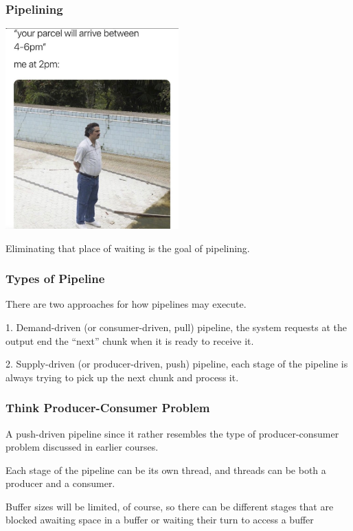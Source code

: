 \begin{frame}
\frametitle{Pipelining}
\begin{center}
	\includegraphics[width=0.5\textwidth]{images/waiting.jpg}
\end{center}


Eliminating that place of waiting is the goal of pipelining.

\end{frame}

\begin{frame}
\frametitle{Types of Pipeline}

There are two approaches for how pipelines may execute. 

1. Demand-driven (or consumer-driven, pull) pipeline, the system requests at the output end the ``next'' chunk when it is ready to receive it.

2. Supply-driven (or producer-driven, push) pipeline, each stage of the pipeline is always trying to pick up the next chunk and process it.

\end{frame}

\begin{frame}
\frametitle{Think Producer-Consumer Problem}

A push-driven pipeline since it rather resembles the type of producer-consumer problem discussed in earlier courses. 

Each stage of the pipeline can be its own thread, and threads can be both a producer and a consumer.

Buffer sizes will be limited, of course, so there can be different stages that are blocked awaiting space in a buffer or waiting their turn to access a buffer


\end{frame}

